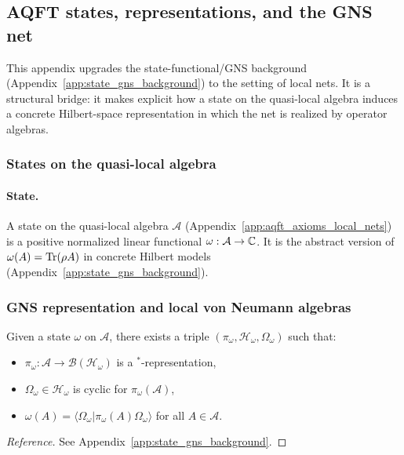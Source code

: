 \subsection{AQFT states, representations, and the GNS net}
\label{app:aqft_states_representations_gns_nets}

This appendix upgrades the state-functional/GNS background (Appendix~\ref{app:state_gns_background}) to the setting of local nets.
It is a structural bridge: it makes explicit how a state on the quasi-local algebra induces a concrete Hilbert-space representation in which the net is realized by operator algebras.

\subsubsection{States on the quasi-local algebra}
\paragraph{State.}
A state on the quasi-local algebra $\mathcal{A}$ (Appendix~\ref{app:aqft_axioms_local_nets}) is a positive normalized linear functional $\omega:\mathcal{A}\to\mathbb{C}$.
It is the abstract version of $\omega(A)=\mathrm{Tr}(\rho A)$ in concrete Hilbert models (Appendix~\ref{app:state_gns_background}).

\subsubsection{GNS representation and local von Neumann algebras}
\begin{theorem}
\label{thm:z128_gns_for_nets}
Given a state $\omega$ on $\mathcal{A}$, there exists a triple $(\pi_\omega,\mathcal{H}_\omega,\Omega_\omega)$ such that:
\begin{itemize}
\item $\pi_\omega:\mathcal{A}\to\mathcal{B}(\mathcal{H}_\omega)$ is a $^\ast$-representation,
\item $\Omega_\omega\in\mathcal{H}_\omega$ is cyclic for $\pi_\omega(\mathcal{A})$,
\item $\omega(A)=\langle \Omega_\omega|\pi_\omega(A)\Omega_\omega\rangle$ for all $A\in\mathcal{A}$.
\end{itemize}
\end{theorem}
\begin{proof}[Reference]
See Appendix~\ref{app:state_gns_background}.
\end{proof}

